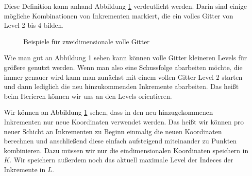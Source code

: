 \documentclass[a4paper,12pt]{llncs}
\numberwithin{equation}{section}
\begin{document}
Diese Definition kann anhand Abbildung \ref{fig:gitter02} verdeutlicht werden. Darin sind einige mögliche Kombinationen von Inkrementen markiert, die ein volles Gitter von Level 2 bis 4 bilden.

\begin{figure}
	\caption{Beispiele für zweidimensionale volle Gitter}
	\label{fig:gitter02}
\end{figure}

Wie man gut an Abbildung \ref{fig:gitter02} sehen kann können volle Gitter kleineren Levels für größere genutzt werden. Wenn man also eine Schussfolge abarbeiten möchte, die immer genauer wird kann man zunächst mit einem vollen Gitter Level 2 starten und dann lediglich die neu hinzukommenden Inkremente abarbeiten. Das heißt beim Iterieren können wir uns an den Levels orientieren.

Wir können an Abbildung \ref{fig:gitter02} sehen, dass in den neu hinzugekommenen Inkrementen nur neue Koordinaten verwendet werden. Das heißt wir können pro neuer Schicht an Inkrementen zu Beginn einmalig die neuen Koordinaten berechnen und anschließend diese einfach aufsteigend miteinander zu Punkten kombinieren. Dazu müssen wir nur die eindimensionalen Koordinaten speichern in $K$. Wir speichern außerdem noch das aktuell maximale Level der Indeces der Inkremente in $L$.
\end{document}
